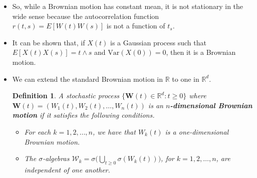 \documentclass[10pt]{article}
\newtheorem{definition}[lemma]{Definition}
\newcommand{\ve}[1]{\mathbf{#1}}
\newcommand{\mrm}[1]{\mathrm{#1}}
\newcommand{\mcal}[1]{\mathcal{#1}}
\newcommand{\Real}{\mathbb{R}}
\begin{document}
\begin{itemize}
  \begin{proof}
    Note that, because $W(\cdot)$ is the standard Brownian motion, we have that $W(t) \sim \mcal{N}(0,t)$. So, obviously, $E[W(t)] = 0$. Moreover, we have that $$E[W^2(t)] = E[W^2(t)] - 0 = E[W^2(t)] - E[(W(t))^2] = \mrm{Var}(W(t)) = t.$$
    Now, Assume $t \geq s \geq 0$. We have that.
    \begin{align*}
      E[W(t)W(s)] 
      &= E[(W(s) + W(t) - W(s))W(s)] \\
      &= E[W^2(s)] + E[(W(t) - W(s))W(s)] \\
      &= s + E[(W(t)-W(s))(W(s)-W(0))] \\
      &= s + E[W(t)-W(s)]E[W(s)-W(0)] \\
      &= s + (E[W(t)] - E[W(s)])(E[W(s)] - E[W(0)]) \\
      &= s = \min(t,s) = t \wedge s
    \end{align*}
    as required.    
  \end{proof}

  \item So, while a Brownian motion has constant mean, it is not stationary in the wide sense because the autocorrelation function $r(t,s) = E[W(t)W(s)]$ is not a function of $t_s$.

  \item It can be shown that, if $X(t)$ is a Gaussian process such that $E[X(t)X(s)] = t \wedge s$ and $\mrm{Var}(X(0)) = 0$, then it is a Brownian motion.

  \item We can extend the standard Brownian motion in $\Real$ to one in $\Real^d$.
  \begin{definition}
    A stochastic process $\{ \ve{W}(t) \in \Real^d : t \geq 0 \}$ where $\ve{W}(t) = (W_1(t), W_2(t), \dotsc, W_n(t))$ is an {\bf $n$-dimensional Brownian motion} if it satisfies the following conditions.
    \begin{itemize}
      \item For each $k = 1, 2, \dotsc, n$, we have that $W_k(t)$ is a one-dimensional Brownian motion.
      \item The $\sigma$-algebras
      $\mcal{W}_k = \sigma\bigg( \bigcup_{t \geq 0} \sigma(W_k(t)) \bigg)$,
      for $k = 1, 2, \dotsc, n$, are independent of one another.
    \end{itemize}
  \end{definition}


\end{itemize}
\end{document}
